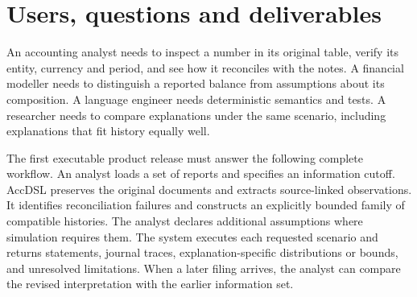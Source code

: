 \section{Users, questions and deliverables}

An accounting analyst needs to inspect a number in its original table, verify
its entity, currency and period, and see how it reconciles with the notes. A
financial modeller needs to distinguish a reported balance from assumptions
about its composition. A language engineer needs deterministic semantics and
tests. A researcher needs to compare explanations under the same scenario,
including explanations that fit history equally well.

The first executable product release must answer the following complete workflow. An analyst
loads a set of reports and specifies an information cutoff. AccDSL preserves
the original documents and extracts source-linked observations. It identifies
reconciliation failures and constructs an explicitly bounded family of
compatible histories. The analyst declares additional assumptions where
simulation requires them. The system executes each requested scenario and
returns statements, journal traces, explanation-specific distributions or
bounds, and unresolved limitations. When a later filing arrives, the analyst
can compare the revised interpretation with the earlier information set.

